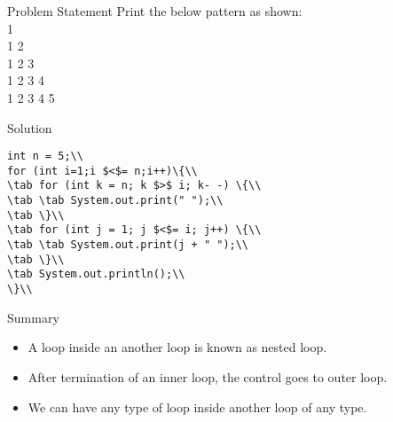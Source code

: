 \documentclass[aspectratio=169,14pt,usenames,dvipsnames]{beamer}
\newcommand\tab[1][1cm]{\hspace*{#1}}
\begin{document}
\begin{frame}{Problem Statement}
Print the below pattern as shown:\\

\hspace{5em} 1\\
\hspace{4em} 1\hspace{0.2em} 2\\
\hspace{3em} 1\hspace{0.2em} 2 \hspace{0.2em}3\\
\hspace{2em} 1\hspace{0.2em} 2\hspace{0.2em} 3\hspace{0.2em} 4\\
\hspace{1em} 1\hspace{0.2em} 2\hspace{0.2em} 3\hspace{0.2em} 4\hspace{0.2em} 5\\
\end{frame}

\begin{frame}{Solution}
\begin{lstlisting}
int n = 5;\\
for (int i=1;i $<$= n;i++)\{\\
\tab for (int k = n; k $>$ i; k- -) \{\\
\tab \tab System.out.print(" ");\\
\tab \}\\
\tab for (int j = 1; j $<$= i; j++) \{\\
\tab \tab System.out.print(j + " ");\\
\tab \}\\
\tab System.out.println();\\
\}\\
\end{lstlisting}
\end{frame}


\begin{frame}{Summary}
\begin{itemize}
    \item A loop inside an another loop is known as
nested loop.
\item After termination of an inner loop, the
control goes to outer loop.
\item We can have any type of loop inside
another loop of any type.
\end{itemize}
\end{frame}
\end{document}
